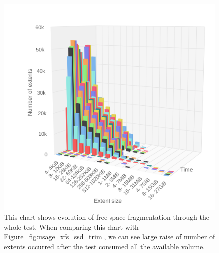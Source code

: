 \documentclass[
  color, %
  table, %
  lof,   %
  lot,   %
]{fithesis3}
\begin{document}
\begin{figure}[h]
    \centering
    \includegraphics[width=\textwidth,keepaspectratio]{../charts/SSD_xfs_trim/free.png}
    \caption[Evolution of free space fragmentation of XFS during testing on SSD with regular trimming]{This chart shows evolution of free space fragmentation through the whole test. When comparing this chart with Figure~\ref{fig:usage_xfs_ssd_trim}, we can see large raise of number of extents occurred after the test consumed all the available volume.}
    \label{fig:free_xfs_ssd_trim}
\end{figure}
\end{document}
